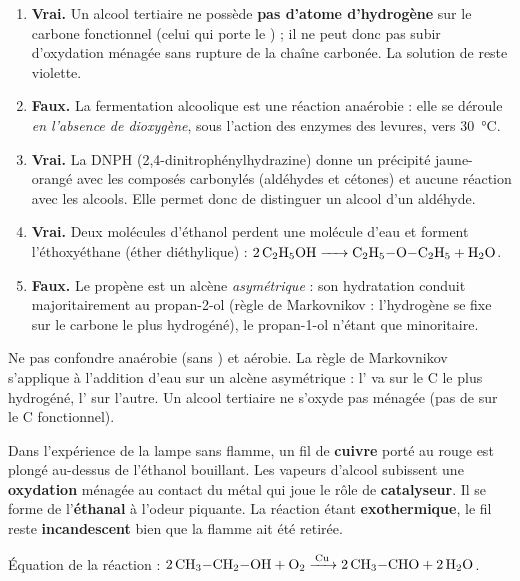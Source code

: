 \documentclass[11pt]{article}
\newcommand{\cle}[1]{{\popxbold\color{popdark}#1}}
\begin{document}
\begin{corrige}
\begin{enumerate}
  \item \textbf{Vrai.} Un alcool tertiaire ne possède \textbf{pas d'atome d'hydrogène} sur le carbone fonctionnel (celui qui porte le ) ; il ne peut donc pas subir d'oxydation ménagée sans rupture de la chaîne carbonée. La solution de  reste violette.
  \item \textbf{Faux.} La fermentation alcoolique est une réaction \cle{anaérobie} : elle se déroule \emph{en l'absence de dioxygène}, sous l'action des enzymes des levures, vers \SI{30}{\celsius}.
  \item \textbf{Vrai.} La DNPH (2,4-dinitrophénylhydrazine) donne un précipité jaune-orangé avec les composés carbonylés (aldéhydes et cétones) et aucune réaction avec les alcools. Elle permet donc de distinguer un alcool d'un aldéhyde.
  \item \textbf{Vrai.} Deux molécules d'éthanol perdent une molécule d'eau et forment l'éthoxyéthane (éther diéthylique) : $\ce{2 C2H5OH -> C2H5-O-C2H5 + H2O}$.
  \item \textbf{Faux.} Le propène est un alcène \emph{asymétrique} : son hydratation conduit majoritairement au \cle{propan-2-ol} (règle de Markovnikov : l'hydrogène se fixe sur le carbone le plus hydrogéné), le propan-1-ol n'étant que minoritaire.
\end{enumerate}
\end{corrige}

\begin{attention}
Ne pas confondre anaérobie (sans ) et aérobie. La règle de Markovnikov s'applique à l'addition d'eau sur un alcène asymétrique : l' va sur le C le plus hydrogéné, l' sur l'autre. Un alcool tertiaire ne s'oxyde pas ménagée (pas de  sur le C fonctionnel).
\end{attention}

\begin{corrige}
Dans l'expérience de la lampe sans flamme, un fil de \textbf{cuivre} porté au rouge est plongé au-dessus de l'éthanol bouillant. Les vapeurs d'alcool subissent une \textbf{oxydation} ménagée au contact du métal qui joue le rôle de \textbf{catalyseur}. Il se forme de l'\textbf{éthanal} à l'odeur piquante. La réaction étant \textbf{exothermique}, le fil reste \textbf{incandescent} bien que la flamme ait été retirée.
\par\medskip
Équation de la réaction : $\ce{2 CH3-CH2-OH + O2 ->[Cu] 2 CH3-CHO + 2 H2O}$.
\end{corrige}
\end{document}

